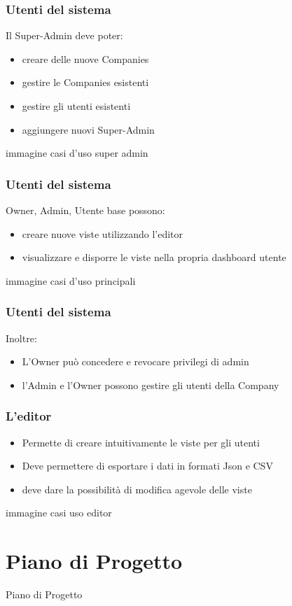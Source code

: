 \begin{frame}
  \frametitle{Utenti del sistema}
  Il Super-Admin deve poter:
  \begin{itemize}
  \item creare delle nuove Companies
  \item gestire le Companies esistenti
  \item gestire gli utenti esistenti
  \item aggiungere nuovi Super-Admin
  \end{itemize}

  immagine casi d'uso super admin
\end{frame}

\begin{frame}
  \frametitle{Utenti del sistema}
  Owner, Admin, Utente base possono:
  \begin{itemize}
  \item creare nuove viste utilizzando l'editor
  \item visualizzare e disporre le viste nella propria dashboard utente
  \end{itemize}

  immagine casi d'uso principali
\end{frame}

\begin{frame}
  \frametitle{Utenti del sistema}
  Inoltre:
  \begin{itemize}
  \item L'Owner può concedere e revocare privilegi di admin
  \item l'Admin e l'Owner possono gestire gli utenti della Company
  \end{itemize}

\end{frame}

\begin{frame}
  \frametitle{L'editor}

  \begin{itemize}
  \item Permette di creare intuitivamente le viste per gli utenti
  \item Deve permettere di esportare i dati in formati Json e CSV
  \item deve dare la possibilità di modifica agevole delle viste
  \end{itemize}

  immagine casi uso editor
\end{frame}

\section{Piano di Progetto}
\begin{frame}
    \huge Piano di Progetto
\end{frame}

